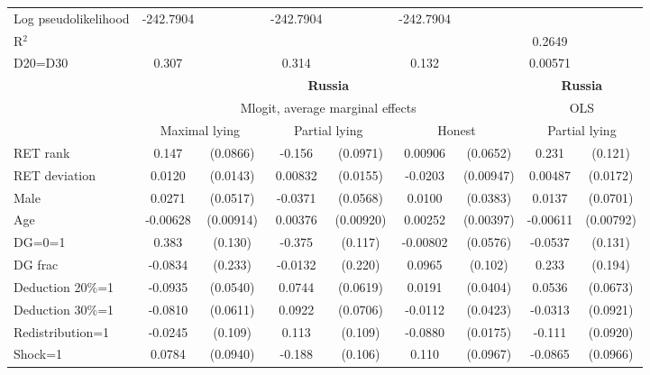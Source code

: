 \begin{tabular}{l|cccccc|cc}
Log pseudolikelihood  & -242.7904   &         &           -242.7904       &         &      -242.7904            &         &           &   \\ 
R$^2$      &                  &         &                  &         &                  &         &         0.2649  &   \\ 
D20=D30         &    0.307         &         &    0.314         &         &    0.132         &         &  0.00571         &         \\
\hline\hline
&\multicolumn{6}{c|}{\bf Russia}&\multicolumn{2}{c}{\bf Russia}\\ &\multicolumn{6}{c|}{Mlogit, average marginal effects }&\multicolumn{2}{c}{OLS}\\
                &\multicolumn{2}{c}{Maximal lying}&\multicolumn{2}{c}{Partial lying}&\multicolumn{2}{c}{Honest}  &\multicolumn{2}{c}{Partial lying}\\
\hline
RET rank        &    0.147\sym{*}  & (0.0866)&   -0.156         & (0.0971)&  0.00906         & (0.0652)&    0.231\sym{*}  &  (0.121)\\
RET deviation   &   0.0120         & (0.0143)&  0.00832         & (0.0155)&  -0.0203\sym{**} &(0.00947)&  0.00487         & (0.0172)\\
Male            &   0.0271         & (0.0517)&  -0.0371         & (0.0568)&   0.0100         & (0.0383)&   0.0137         & (0.0701)\\
Age             & -0.00628         &(0.00914)&  0.00376         &(0.00920)&  0.00252         &(0.00397)& -0.00611         &(0.00792)\\
DG=0=1          &    0.383\sym{***}&  (0.130)&   -0.375\sym{***}&  (0.117)& -0.00802         & (0.0576)&  -0.0537         &  (0.131)\\
DG frac         &  -0.0834         &  (0.233)&  -0.0132         &  (0.220)&   0.0965         &  (0.102)&    0.233         &  (0.194)\\
Deduction 20\%=1&  -0.0935\sym{*}  & (0.0540)&   0.0744         & (0.0619)&   0.0191         & (0.0404)&   0.0536         & (0.0673)\\
Deduction 30\%=1&  -0.0810         & (0.0611)&   0.0922         & (0.0706)&  -0.0112         & (0.0423)&  -0.0313         & (0.0921)\\
Redistribution=1&  -0.0245         &  (0.109)&    0.113         &  (0.109)&  -0.0880\sym{***}& (0.0175)&   -0.111         & (0.0920)\\
Shock=1         &   0.0784         & (0.0940)&   -0.188\sym{*}  &  (0.106)&    0.110         & (0.0967)&  -0.0865         & (0.0966)\\

\end{tabular}
